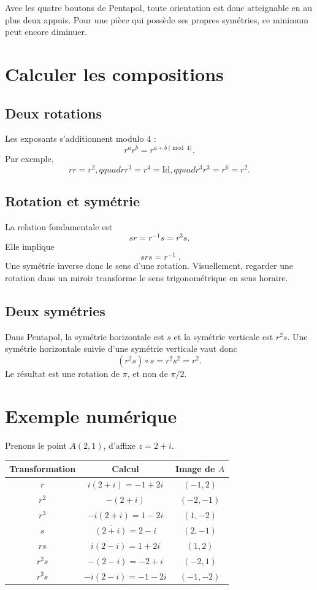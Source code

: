 \documentclass[11pt,a4paper]{article}
\newcommand{\id}{\mathrm{Id}}
\newcommand{\conj}[1]{\overline{#1}}
\begin{document}
Avec les quatre boutons de Pentapol, toute orientation est donc atteignable en au plus deux
appuis. Pour une pi\`ece qui poss\`ede ses propres sym\'etries, ce minimum peut encore diminuer.

\section{Calculer les compositions}

\subsection*{Deux rotations}

Les exposants s'additionnent modulo $4$ :
\[
  r^ar^b=r^{a+b\pmod 4}.
\]
Par exemple,
\[
  rr=r^2,qquad rr^3=r^4=\id,qquad r^3r^3=r^6=r^2.
\]

\subsection*{Rotation et sym\'etrie}

La relation fondamentale est
\[
  sr=r^{-1}s=r^3s.
\]
Elle implique
\[
  \boxed{\;srs=r^{-1}\;}.
\]
Une sym\'etrie inverse donc le sens d'une rotation. Visuellement, regarder une rotation dans un
miroir transforme le sens trigonom\'etrique en sens horaire.

\subsection*{Deux sym\'etries}

Dans Pentapol, la sym\'etrie horizontale est $s$ et la sym\'etrie verticale est $r^2s$. Une
sym\'etrie horizontale suivie d'une sym\'etrie verticale vaut donc
\[
  (r^2s)\circ s=r^2s^2=r^2.
\]
Le r\'esultat est une rotation de $\pi$, et non de $\pi/2$.

\section{Exemple num\'erique}

Prenons le point $A(2,1)$, d'affixe $z=2+i$.

\begin{center}
\begin{tabular}{ccc}
\toprule
Transformation & Calcul & Image de $A$\\
\midrule
$r$ & $i(2+i)=-1+2i$ & $(-1,2)$\\
$r^2$ & $-(2+i)$ & $(-2,-1)$\\
$r^3$ & $-i(2+i)=1-2i$ & $(1,-2)$\\
$s$ & $\conj{(2+i)}=2-i$ & $(2,-1)$\\
$rs$ & $i(2-i)=1+2i$ & $(1,2)$\\
$r^2s$ & $-(2-i)=-2+i$ & $(-2,1)$\\
$r^3s$ & $-i(2-i)=-1-2i$ & $(-1,-2)$\\
\bottomrule
\end{tabular}
\end{center}
\end{document}
